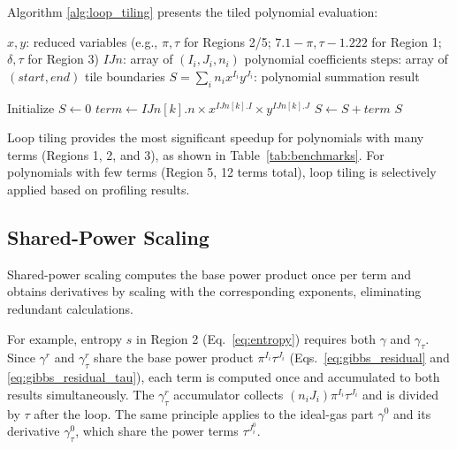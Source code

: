 \documentclass{article}
\begin{document}
Algorithm \ref{alg:loop_tiling} presents the tiled polynomial evaluation:

\begin{algorithm}[H]
\caption{Loop Tiling for Single Polynomial (for $N$ terms partitioned into $M$ tiles)}
\label{alg:loop_tiling}
\begin{algorithmic}[1]
\REQUIRE $x, y$: reduced variables (e.g., $\pi, \tau$ for Regions 2/5; $7.1{-}\pi, \tau{-}1.222$ for Region 1; $\delta, \tau$ for Region 3)
\REQUIRE $IJn$: array of $(I_i, J_i, n_i)$ polynomial coefficients
\REQUIRE $\text{steps}$: array of $(start, end)$ tile boundaries
\ENSURE $S = \sum_i n_i x^{I_i} y^{J_i}$: polynomial summation result

\STATE Initialize $S \leftarrow 0$
        \STATE $term \leftarrow IJn[k].n \times x^{IJn[k].I} \times y^{IJn[k].J}$
        \STATE $S \leftarrow S + term$
    \ENDFOR
\ENDFOR
\RETURN $S$
\end{algorithmic}
\end{algorithm}

Loop tiling provides the most significant speedup for polynomials with many terms (Regions 1, 2, and 3), as shown in Table~\ref{tab:benchmarks}. For polynomials with few terms (Region 5, 12 terms total), loop tiling is selectively applied based on profiling results.

\subsection{Shared-Power Scaling}
\label{sec:shared_power_scaling}

Shared-power scaling computes the base power product once per term and obtains derivatives by scaling with the corresponding exponents, eliminating redundant calculations.

For example, entropy $s$ in Region 2 (Eq.~\ref{eq:entropy}) requires both $\gamma$ and $\gamma_\tau$.  Since $\gamma^r$ and $\gamma^r_\tau$ share the base power product $\pi^{I_i}\tau^{J_i}$ (Eqs.~\eqref{eq:gibbs_residual} and \eqref{eq:gibbs_residual_tau}), each term is computed once and accumulated to both results simultaneously. The $\gamma^r_\tau$ accumulator collects $(n_i J_i) \pi^{I_i}\tau^{J_i}$ and is divided by $\tau$ after the loop.
The same principle applies to the ideal-gas part $\gamma^0$ and its derivative $\gamma^0_\tau$, which share the power terms $\tau^{J_i^0}$.
\end{document}
